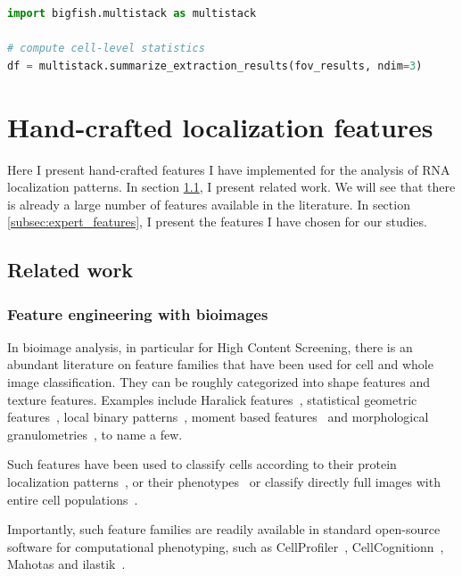 \begin{minipage}{0.9\textwidth}
\begin{lstlisting}[language=Python]
import bigfish.multistack as multistack

# compute cell-level statistics
df = multistack.summarize_extraction_results(fov_results, ndim=3)
\end{lstlisting}
\end{minipage}

\section{Hand-crafted localization features}
\label{sec:hand_features}

Here I present hand-crafted features I have implemented for the analysis of \ac{RNA} localization patterns. 
In section \ref{subsec:related_work_hand_features}, I present related work. We will see that there is already a large number of features available in the literature. In section \ref{subsec:expert_features}, I present the features I have chosen for our studies. 



\subsection{Related work}
\label{subsec:related_work_hand_features}

\subsubsection{Feature engineering with bioimages}

In bioimage analysis, in particular for High Content Screening, there is an abundant literature on feature families that have been used for cell and whole image classification. They can be roughly categorized into shape features and texture features. Examples include Haralick features~\cite{Haralick1973}, statistical geometric features~\cite{Walker1996}, local binary patterns~\cite{ahonen_2006}, moment based features~\cite{Reeve1992} and morphological granulometries~\cite{Serra1983}, to name a few. 

Such features have been used to classify cells according to their protein localization patterns~\cite{Boland1998, Glory2007}, or their phenotypes~\cite{Wang2008, Jones2009, Walter2010} or classify directly full images with entire cell populations~\cite{Uhlmann2016}. 

Importantly, such feature families are readily available in standard open-source software for computational phenotyping, such as CellProfiler~\cite{Carpenter2006, Jones2008, mcquin_cellprofiler_2018}, CellCognitionn~\cite{held_cellcognition_2010}, Mahotas \cite{mahotas_2013} and ilastik~\cite{berg_ilastik_2019}.  

